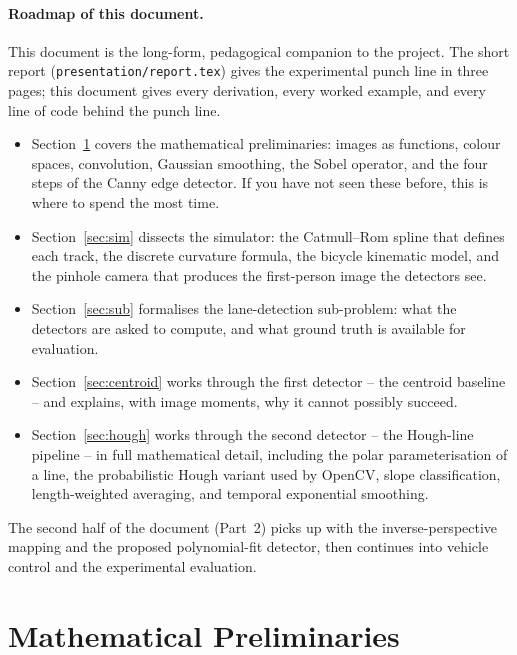 \paragraph{Roadmap of this document.}
This document is the long-form, pedagogical companion to the project.
The short report (\texttt{presentation/report.tex}) gives the
experimental punch line in three pages; this document gives every
derivation, every worked example, and every line of code behind the
punch line.
\begin{itemize}[leftmargin=1.4em,itemsep=2pt]
  \item Section~\ref{sec:prelim} covers the mathematical preliminaries:
        images as functions, colour spaces, convolution, Gaussian
        smoothing, the Sobel operator, and the four steps of the Canny
        edge detector. If you have not seen these before, this is
        where to spend the most time.
  \item Section~\ref{sec:sim} dissects the simulator: the
        Catmull--Rom spline that defines each track, the discrete
        curvature formula, the bicycle kinematic model, and the
        pinhole camera that produces the first-person image the
        detectors see.
  \item Section~\ref{sec:sub} formalises the lane-detection sub-problem:
        what the detectors are asked to compute, and what ground truth
        is available for evaluation.
  \item Section~\ref{sec:centroid} works through the first detector --
        the centroid baseline -- and explains, with image moments, why
        it cannot possibly succeed.
  \item Section~\ref{sec:hough} works through the second detector --
        the Hough-line pipeline -- in full mathematical detail,
        including the polar parameterisation of a line, the
        probabilistic Hough variant used by OpenCV, slope
        classification, length-weighted averaging, and temporal
        exponential smoothing.
\end{itemize}
The second half of the document (Part~2) picks up with the
inverse-perspective mapping and the proposed polynomial-fit detector,
then continues into vehicle control and the experimental evaluation.

\section{Mathematical Preliminaries}
\label{sec:prelim}

